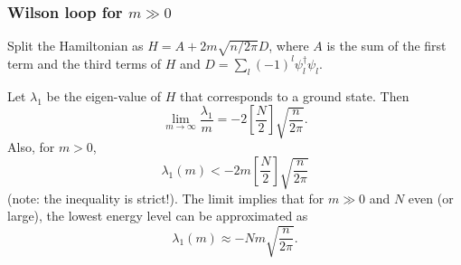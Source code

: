 \subsubsection{Wilson loop for $m \gg 0$}
Split the Hamiltonian as $H = A + 2m\sqrt{n/2\pi} D$, where $A$ is the sum of the first term and the third terms of $H$ and $D = \sum_l (-1)^l \psi_l^\dagger \psi_l$.
\begin{proposition}\label{p:lambda_est_pos}
Let $\lambda_1$ be the eigen-value of $H$ that corresponds to a ground state. Then
\[
\lim_{m \rightarrow \infty} \frac{\lambda_1}{m} = -2\left[\frac{N}{2}\right]\sqrt{\frac{n}{2\pi}}.
\]
Also, for $m > 0$,
\[
\lambda_1(m) < -2m\left[\frac{N}{2}\right]\sqrt{\frac{n}{2\pi}}
\]
(note: the inequality is strict!). The limit implies that for $m \gg 0$ and $N$ even (or large), the lowest energy level can be approximated as 
\[
\lambda_1(m) \approx - Nm \sqrt{\frac{n}{2\pi}}.
\]
\end{proposition}

